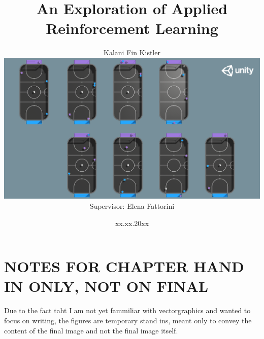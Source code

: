 \documentclass[a4paper,openright]{scrreprt}
\title{An Exploration of Applied Reinforcement Learning}
\author{\texorpdfstring{Kalani Fin Kistler \\[1cm]\includegraphics[scale=0.2]{figures/Screenshot from 2020-09-22 23-05-59.png}\\[1cm] {\small Supervisor: Elena Fattorini}}{Kalani Fin Kistler}}
\date{\small xx.xx.20xx}
\begin{document}
\maketitle %
\cleardoublepage
{} %
\tableofcontents %
\cleardoublepage %


\chapter*{NOTES FOR CHAPTER HAND IN ONLY, NOT ON FINAL}
Due to the fact taht I am not yet fammiliar with vectorgraphics and wanted to focus on writing, the figures are temporary stand ins, meant only to convey the content of the final image and not the final image itself.




 

\appendix 
\listoffigures 
\listoftables 
\end{document}
